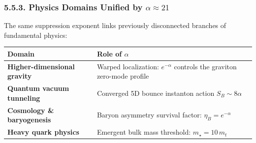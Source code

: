 \documentclass[
  11pt,
]{article}
\begin{document}
\hypertarget{physics-domains-unified-by-alpha-approx-21}{%
\subsubsection{\texorpdfstring{5.5.3. Physics Domains Unified by
\(\alpha \approx 21\)}{5.5.3. Physics Domains Unified by \textbackslash alpha \textbackslash approx 21}}\label{physics-domains-unified-by-alpha-approx-21}}

The same suppression exponent links previously disconnected branches of
fundamental physics:

\begin{longtable}[]{@{}ll@{}}
\toprule
\begin{minipage}[b]{0.30\columnwidth}\raggedright
Domain\strut
\end{minipage} & \begin{minipage}[b]{0.64\columnwidth}\raggedright
Role of \(\alpha\)\strut
\end{minipage}\tabularnewline
\midrule
\endhead
\begin{minipage}[t]{0.30\columnwidth}\raggedright
\textbf{Higher-dimensional gravity}\strut
\end{minipage} & \begin{minipage}[t]{0.64\columnwidth}\raggedright
Warped localization: \(e^{-\alpha}\) controls the graviton zero-mode
profile\strut
\end{minipage}\tabularnewline
\begin{minipage}[t]{0.30\columnwidth}\raggedright
\textbf{Quantum vacuum tunneling}\strut
\end{minipage} & \begin{minipage}[t]{0.64\columnwidth}\raggedright
Converged 5D bounce instanton action \(S_B \sim 8\alpha\)\strut
\end{minipage}\tabularnewline
\begin{minipage}[t]{0.30\columnwidth}\raggedright
\textbf{Cosmology \& baryogenesis}\strut
\end{minipage} & \begin{minipage}[t]{0.64\columnwidth}\raggedright
Baryon asymmetry survival factor: \(\eta_B = e^{-\alpha}\)\strut
\end{minipage}\tabularnewline
\begin{minipage}[t]{0.30\columnwidth}\raggedright
\textbf{Heavy quark physics}\strut
\end{minipage} & \begin{minipage}[t]{0.64\columnwidth}\raggedright
Emergent bulk mass threshold: \(m_\star = 10\,m_t\)\strut

\end{minipage}
\end{longtable}
\end{document}
